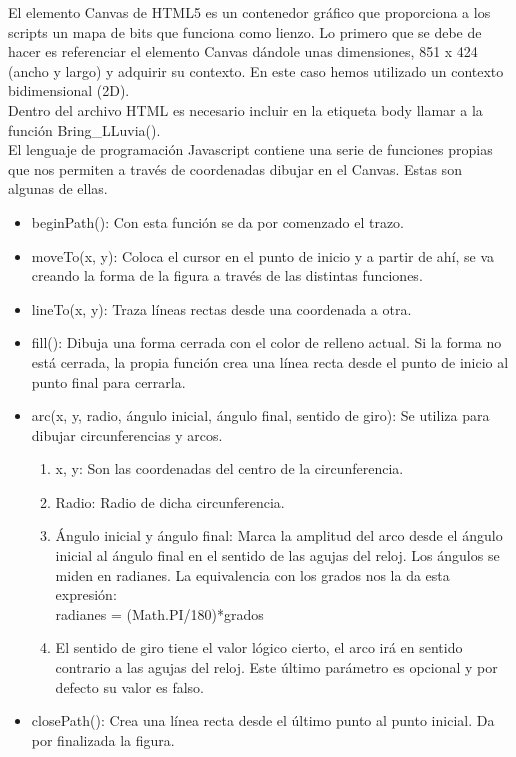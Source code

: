 El elemento Canvas  de HTML5 es un contenedor gráfico que  proporciona a los scripts  un mapa de bits  que funciona como lienzo.
Lo primero que se debe de hacer es referenciar el elemento Canvas dándole unas dimensiones, 851 x 424 (ancho y largo) y adquirir su contexto.
En este caso hemos utilizado un contexto bidimensional (2D).\\

Dentro del archivo HTML es necesario incluir en la 
etiqueta body llamar a la función Bring\_LLuvia().\\

El lenguaje de programación Javascript contiene una serie de funciones propias que nos permiten  a través de coordenadas dibujar en el Canvas.
Estas son algunas de ellas.

\begin{itemize}
 \item beginPath():  Con esta función se da por comenzado el trazo.
 \item moveTo(x, y): Coloca el cursor en el punto de inicio y a partir de ahí, se va creando la forma de la figura a través de las distintas 
 funciones.
 \item lineTo(x, y): Traza líneas rectas desde una coordenada a otra.
 \item fill(): Dibuja una forma cerrada con el color de relleno actual. Si la forma no está cerrada, la propia función crea una línea recta 
 desde el punto de inicio  al punto final para cerrarla.
 \item arc(x, y, radio, ángulo inicial, ángulo final, sentido de giro):  Se utiliza para dibujar circunferencias y arcos.
 \begin{enumerate}
 \item x, y: Son las coordenadas del centro de la circunferencia.
 \item Radio: Radio de dicha circunferencia.
 \item Ángulo inicial y ángulo final: Marca la amplitud del arco desde el ángulo inicial al ángulo final en el sentido de las agujas del reloj. Los ángulos se miden en radianes. 
 La equivalencia con los grados nos la da esta expresión:\\
 radianes = (Math.PI/180)*grados
 \item El sentido de giro tiene el valor lógico cierto, el arco irá en sentido contrario a las agujas del reloj. Este último parámetro es 
 opcional y por defecto su valor es falso.
 \end{enumerate}
 \item closePath(): Crea una línea recta desde el último punto al punto inicial. Da por finalizada la figura.
\end{itemize}

